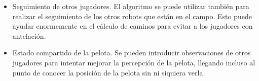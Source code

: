 \begin{itemize}
\item Seguimiento de otros jugadores. El algoritmo se puede utilizar también para realizar el seguimiento de los otros robots que están en el campo. Esto puede ayudar enormemente en el cálculo de caminos para evitar a los jugadores con antelación.

\item Estado compartido de la pelota. Se pueden introducir observaciones de otros jugadores para intentar mejorar la percepción de la pelota, llegando incluso al punto de conocer la posición de la pelota sin ni siquiera verla.

\end{itemize}
